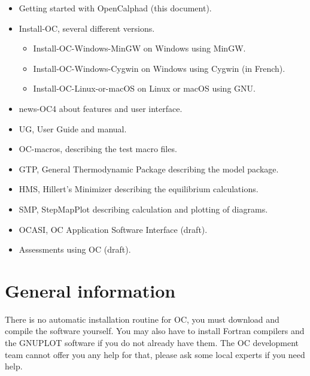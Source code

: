 \documentclass[12pt]{article}
\begin{document}
\begin{itemize}
\item Getting started with OpenCalphad (this document).
\item Install-OC, several different versions.
\begin{itemize}
\item Install-OC-Windows-MinGW on Windows using MinGW.
\item Install-OC-Windows-Cygwin on Windows using Cygwin (in French).
\item Install-OC-Linux-or-macOS on Linux or macOS using GNU.
\end{itemize}
\item news-OC4 about features and user interface.
\item UG, User Guide and manual.
\item OC-macros, describing the test macro files.
\item GTP, General Thermodynamic Package describing the model package.
\item HMS, Hillert's Minimizer describing the equilibrium calculations.
\item SMP, StepMapPlot describing calculation and plotting of diagrams.
\item OCASI, OC Application Software Interface (draft).
\item Assessments using OC (draft).
\end{itemize}

\section{General information}

There is no automatic installation routine for OC, you must download
and compile the software yourself.  You may also have to install
Fortran compilers and the GNUPLOT software if you do not already have
them.  The OC development team cannot offer you any help for that,
please ask some local experts if you need help.
\end{document}
